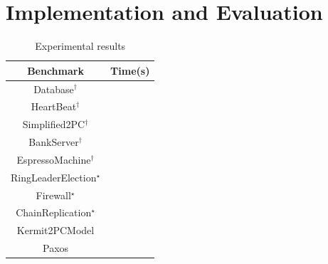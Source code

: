 \section{Implementation and Evaluation}\label{sec:impl}

\begin{table}[t]
  \renewcommand{\arraystretch}{0.8}
  \caption{\small Experimental results  }
\vspace*{-.1in}
\footnotesize
\setlength{\tabcolsep}{2.3pt}
\begin{tabular}{c|c}
  \toprule
 Benchmark & Time(s)\\
\midrule
\textsf{Database}$^{\dagger}$ &  \\
\midrule
\textsf{HeartBeat}$^{\dagger}$ & \\
\midrule
\textsf{Simplified2PC}$^{\dagger}$ & \\
\midrule
\textsf{BankServer}$^{\dagger}$  &\\
\midrule
\textsf{EspressoMachine}$^{\dagger}$  &  \\
\midrule
\textsf{RingLeaderElection}$^{\star}$ & \\
\midrule
\textsf{Firewall}$^{\star}$ & \\
\midrule
\textsf{ChainReplication}$^{\star}$ &  \\
\midrule
\textsf{Kermit2PCModel} &  \\
\midrule
\textsf{Paxos} &  \\
\bottomrule
\end{tabular}

\label{tab:evaluation}
\end{table}
